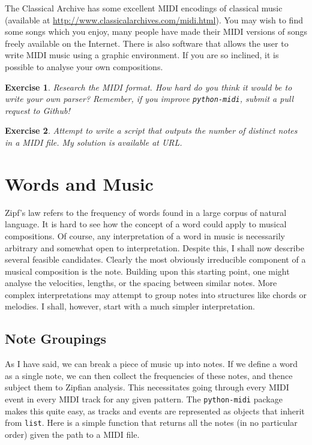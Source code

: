 \documentclass[10pt]{book}
\newtheorem{exercise}{Exercise}[chapter]
\begin{document}
The Classical Archive has some excellent MIDI encodings of classical music (available at \url{http://www.classicalarchives.com/midi.html}). You may wish to find some songs which you enjoy, many people have made their MIDI versions of songs freely available on the Internet. There is also software that allows the user to write MIDI music using a graphic environment. If you are so inclined, it is possible to analyse your own compositions.


\begin{exercise}
Research the MIDI format. How hard do you think it would be to write your own parser? Remember, if you improve \texttt{python-midi}, submit a pull request to Github!
\end{exercise}

\begin{exercise}
Attempt to write a script that outputs the number of distinct notes in a MIDI file. My solution is available at URL.
\end{exercise}


\section{Words and Music}

Zipf's law refers to the frequency of words found in a large corpus of natural language. It is hard to see how the concept of a word could apply to musical compositions. Of course, any interpretation of a word in music is necessarily arbitrary and somewhat open to interpretation. Despite this, I shall now describe several feasible candidates. Clearly the most obviously irreducible component of a musical composition is the note. Building upon this starting point, one might analyse the velocities, lengths, or the spacing between similar notes. More complex interpretations may attempt to group notes into structures like chords or melodies. I shall, however, start with a much simpler interpretation.

\subsection{Note Groupings}
As I have said, we can break a piece of music up into notes. If we define a word as a single note, we can then collect the frequencies of these notes, and thence subject them to Zipfian analysis. This necessitates going through every MIDI event in every MIDI track for any given pattern. The \texttt{python-midi} package makes this quite easy, as tracks and events are represented as objects that inherit from \texttt{list}. Here is a simple function that returns all the notes (in no particular order) given the path to a MIDI file.
\end{document}
